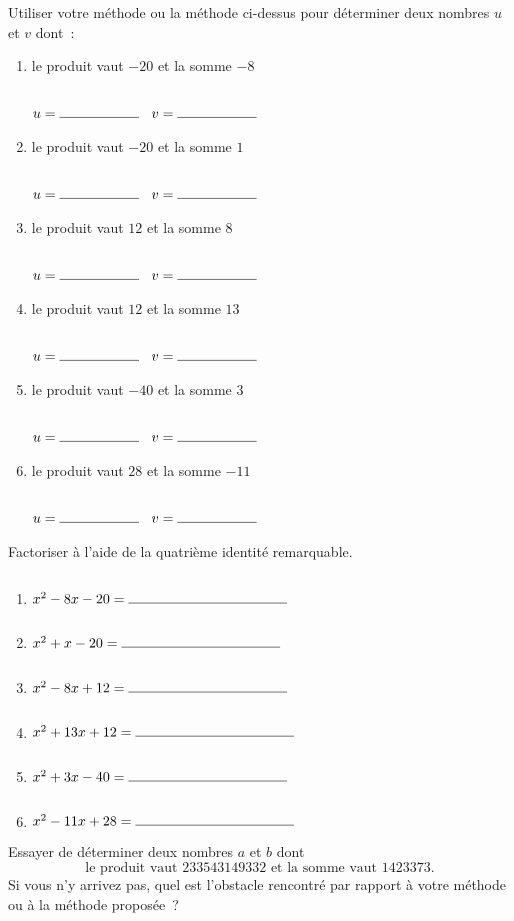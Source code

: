\documentclass[a4paper,12pt]{article}
\begin{document}
\begin{activite}
\begin{tasks}
	Utiliser votre méthode ou la méthode ci-dessus pour déterminer deux nombres $u$ et $v$ dont~:
	\begin{multicols}{2}
	\begin{enumerate}
\item le produit vaut $-20$ et la somme $-8$

\vspace{15pt}
$u=\ligne{2}$ $v=\ligne{2}$
\item le produit vaut $-20$ et la somme $1$

\vspace{15pt}
$u=\ligne{2}$ $v=\ligne{2}$
\item le produit vaut $12$ et la somme $8$

\vspace{15pt}
$u=\ligne{2}$ $v=\ligne{2}$
\item le produit vaut $12$ et la somme $13$

\vspace{15pt}
$u=\ligne{2}$ $v=\ligne{2}$
\item le produit vaut $-40$ et la somme $3$

\vspace{15pt}
$u=\ligne{2}$ $v=\ligne{2}$
\item le produit vaut $28$ et la somme $-11$

\vspace{15pt}
$u=\ligne{2}$ $v=\ligne{2}$
	
\end{enumerate}
\end{multicols}
\task[d)] Factoriser à l'aide de la quatrième identité remarquable.
	\begin{multicols}{2}
	\begin{enumerate}
\item $x^2-8x-20=\ligne{4}$
\item $x^2+x-20=\ligne{4}$
\item $x^2-8x+12=\ligne{4}$
\item $x^2+13x+12=\ligne{4}$
\item $x^2+3x-40=\ligne{4}$
\item $x^2-11x+28=\ligne{4}$	
\end{enumerate}
\end{multicols}
\task[e)] Essayer de déterminer deux nombres $a$ et $b$ dont \[\text{le produit vaut } 233543149332 \text{ et la somme vaut } 1423373.\]
Si vous n'y arrivez pas, quel est l'obstacle rencontré par rapport à votre méthode ou à la méthode proposée~?

	\vspace{15pt}
	\myrulefill
	\vspace{15pt}

	\myrulefill
	\vspace{15pt}

	\myrulefill
	\vspace{15pt}


	\myrulefill
	\vspace{15pt}


\end{tasks}
\end{activite}
\end{document}
